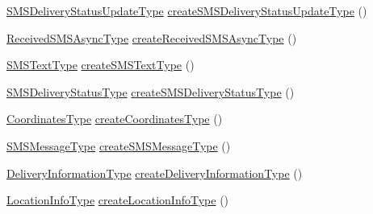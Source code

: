 \begin{DoxyCompactItemize}
\item 
\hyperlink{classcom_1_1telefonica_1_1schemas_1_1unica_1_1rest_1_1sms_1_1v1_1_1SMSDeliveryStatusUpdateType}{SMSDeliveryStatusUpdateType} \hyperlink{classcom_1_1telefonica_1_1schemas_1_1unica_1_1rest_1_1sms_1_1v1_1_1ObjectFactory_aeb0d7ad2840d4269609a27b35e52431d}{createSMSDeliveryStatusUpdateType} ()
\item 
\hyperlink{classcom_1_1telefonica_1_1schemas_1_1unica_1_1rest_1_1sms_1_1v1_1_1ReceivedSMSAsyncType}{ReceivedSMSAsyncType} \hyperlink{classcom_1_1telefonica_1_1schemas_1_1unica_1_1rest_1_1sms_1_1v1_1_1ObjectFactory_a0d06a23784913d792d435b2ca9e6ae80}{createReceivedSMSAsyncType} ()
\item 
\hyperlink{classcom_1_1telefonica_1_1schemas_1_1unica_1_1rest_1_1sms_1_1v1_1_1SMSTextType}{SMSTextType} \hyperlink{classcom_1_1telefonica_1_1schemas_1_1unica_1_1rest_1_1sms_1_1v1_1_1ObjectFactory_aa895a2785d29997f5ae52cbcb284e199}{createSMSTextType} ()
\item 
\hyperlink{classcom_1_1telefonica_1_1schemas_1_1unica_1_1rest_1_1sms_1_1v1_1_1SMSDeliveryStatusType}{SMSDeliveryStatusType} \hyperlink{classcom_1_1telefonica_1_1schemas_1_1unica_1_1rest_1_1sms_1_1v1_1_1ObjectFactory_a203caf050e8adde12b7642c737053cdf}{createSMSDeliveryStatusType} ()
\item 
\hyperlink{classcom_1_1telefonica_1_1schemas_1_1unica_1_1rest_1_1sms_1_1v1_1_1CoordinatesType}{CoordinatesType} \hyperlink{classcom_1_1telefonica_1_1schemas_1_1unica_1_1rest_1_1sms_1_1v1_1_1ObjectFactory_a1b00c95ddd4590b990b4679ca0fa0060}{createCoordinatesType} ()
\item 
\hyperlink{classcom_1_1telefonica_1_1schemas_1_1unica_1_1rest_1_1sms_1_1v1_1_1SMSMessageType}{SMSMessageType} \hyperlink{classcom_1_1telefonica_1_1schemas_1_1unica_1_1rest_1_1sms_1_1v1_1_1ObjectFactory_a697bc2ac86189372613f112b89c4d4b5}{createSMSMessageType} ()
\item 
\hyperlink{classcom_1_1telefonica_1_1schemas_1_1unica_1_1rest_1_1sms_1_1v1_1_1DeliveryInformationType}{DeliveryInformationType} \hyperlink{classcom_1_1telefonica_1_1schemas_1_1unica_1_1rest_1_1sms_1_1v1_1_1ObjectFactory_a82948762795eea8d26e6444d6d39d822}{createDeliveryInformationType} ()
\item 
\hyperlink{classcom_1_1telefonica_1_1schemas_1_1unica_1_1rest_1_1sms_1_1v1_1_1LocationInfoType}{LocationInfoType} \hyperlink{classcom_1_1telefonica_1_1schemas_1_1unica_1_1rest_1_1sms_1_1v1_1_1ObjectFactory_a782291ca15aa702384d65e00970424e5}{createLocationInfoType} ()
\item 

\end{DoxyCompactItemize}
